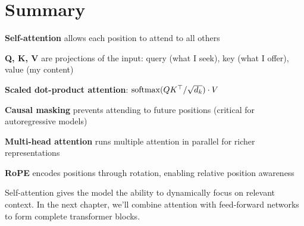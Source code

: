 \section{Summary}

\begin{summary}
    \item \textbf{Self-attention} allows each position to attend to all others
    \item \textbf{Q, K, V} are projections of the input: query (what I seek), key (what I offer), value (my content)
    \item \textbf{Scaled dot-product attention}: $\operatorname{softmax}(QK^\top / \sqrt{d_k}) \cdot V$
    \item \textbf{Causal masking} prevents attending to future positions (critical for autoregressive models)
    \item \textbf{Multi-head attention} runs multiple attention in parallel for richer representations
    \item \textbf{RoPE} encodes positions through rotation, enabling relative position awareness
\end{summary}

Self-attention gives the model the ability to dynamically focus on relevant context. In the next chapter, we'll combine attention with feed-forward networks to form complete transformer blocks.
